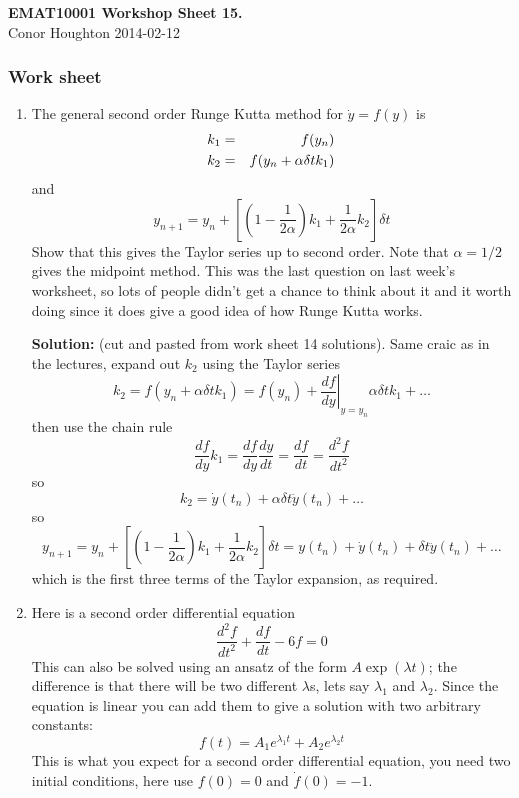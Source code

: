 \documentclass[12pt]{article}
\begin{document}
\begin{center}
{\bf EMAT10001 Workshop Sheet 15.}\\[1cm]{} Conor Houghton 2014-02-12
\end{center}

\subsubsection*{Work sheet}

\begin{enumerate}

\item The general second order Runge Kutta method for $\dot{y}=f(y)$ is
\begin{eqnarray}
k_1&=&f(y_n)\cr
k_2&=&f(y_n+\alpha \delta t k_1)
\end{eqnarray}
and
\begin{equation}
y_{n+1}=y_n+\left[\left(1-\frac{1}{2\alpha}\right)k_1+\frac{1}{2\alpha}k_2\right]\delta t
\end{equation}
Show that this gives the Taylor series up to second order. Note that
$\alpha=1/2$ gives the midpoint method. This was the last question on
last week's worksheet, so lots of people didn't get a chance to think
about it and it worth doing since it does give a good idea of how
Runge Kutta works.

\textbf{Solution: } (cut and pasted from work sheet 14
solutions). Same craic as in the lectures, expand out $k_2$ using the
Taylor series
\begin{equation}
k_2=f(y_n+\alpha \delta t k_1)=f(y_n)+\left.\frac{df}{dy}\right|_{y=y_n}\alpha \delta t k_1+\ldots
\end{equation}
then use the chain rule 
\begin{equation}
\frac{df}{dy}k_1=\frac{df}{dy}\frac{dy}{dt}=\frac{df}{dt}=\frac{d^2f}{dt^2}
\end{equation}
so
\begin{equation}
k_2=\dot{y}(t_n)+\alpha \delta t \ddot{y}(t_n)+\ldots
\end{equation}
so
\begin{equation}
y_{n+1}=y_n+\left[\left(1-\frac{1}{2\alpha}\right)k_1+\frac{1}{2\alpha}k_2\right]\delta t=y(t_n)+\dot{y}(t_n)+\delta t \ddot{y}(t_n)+\ldots
\end{equation}
which is the first three terms of the Taylor expansion, as required.


\item Here is a second order differential equation
\begin{equation}
\frac{d^2f}{dt^2}+\frac{df}{dt}-6f=0
\end{equation}
This can also be solved using an ansatz of the form $A\exp{(\lambda
  t)}$; the difference is that there will be two different $\lambda$s, lets say $\lambda_1$ and $\lambda_2$. Since the equation is linear you can add them to give a solution with two arbitrary constants:
\begin{equation}
f(t)=A_1e^{\lambda_1t}+A_2e^{\lambda_2 t}
\end{equation}
This is what you expect for a second order differential equation, you
need two initial conditions, here use $f(0)=0$ and $\dot{f}(0)=-1$.


\end{enumerate}
\end{document}
